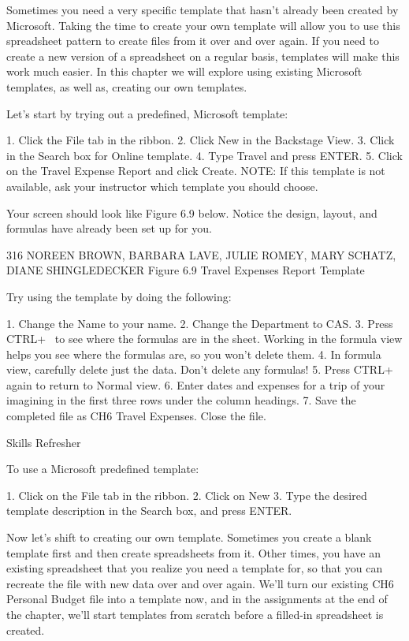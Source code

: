 Sometimes you need a very specific template that hasn’t already been created by Microsoft. Taking the
time to create your own template will allow you to use this spreadsheet pattern to create files from it
over and over again. If you need to create a new version of a spreadsheet on a regular basis, templates
will make this work much easier. In this chapter we will explore using existing Microsoft templates,
as well as, creating our own templates.

Let’s start by trying out a predefined, Microsoft template:

1.   Click the File tab in the ribbon.
2.   Click New in the Backstage View.
3.   Click in the Search box for Online template.
4.   Type Travel and press ENTER.
5.   Click on the Travel Expense Report and click Create. NOTE: If this template is not available,
ask your instructor which template you should choose.

Your screen should look like Figure 6.9 below. Notice the design, layout, and formulas have already
been set up for you.




316 NOREEN BROWN, BARBARA LAVE, JULIE ROMEY, MARY SCHATZ, DIANE SHINGLEDECKER
Figure 6.9 Travel Expenses Report Template


Try using the template by doing the following:

1. Change the Name to your name.
2. Change the Department to CAS.
3. Press CTRL+~ to see where the formulas are in the sheet. Working in the formula view helps
you see where the formulas are, so you won’t delete them.
4. In formula view, carefully delete just the data. Don’t delete any formulas!
5. Press CTRL+~ again to return to Normal view.
6. Enter dates and expenses for a trip of your imagining in the first three rows under the column
headings.
7. Save the completed file as CH6 Travel Expenses. Close the file.


Skills Refresher


To use a Microsoft predefined template:

1. Click on the File tab in the ribbon.
2. Click on New
3. Type the desired template description in the Search box, and press ENTER.



Now let’s shift to creating our own template. Sometimes you create a blank template first and then
create spreadsheets from it. Other times, you have an existing spreadsheet that you realize you need
a template for, so that you can recreate the file with new data over and over again. We’ll turn our
existing CH6 Personal Budget file into a template now, and in the assignments at the end of the
chapter, we’ll start templates from scratch before a filled-in spreadsheet is created.

